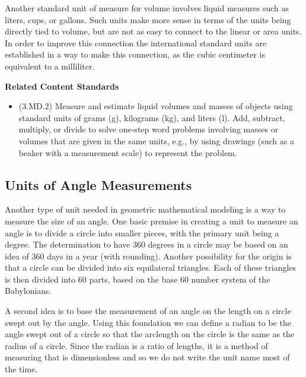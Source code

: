 \documentclass[
]{book}
\providecommand{\tightlist}{%
  \setlength{\itemsep}{0pt}\setlength{\parskip}{0pt}}
\newenvironment{standards}{}{}
\theoremstyle{definition}
\theoremstyle{definition}
\theoremstyle{definition}
\theoremstyle{definition}
\theoremstyle{remark}
\begin{document}
Another standard unit of measure for volume involves liquid measures such as liters, cups, or gallons. Such units make more sense in terms of the units being directly tied to volume, but are not as easy to connect to the linear or area units. In order to improve this connection the international standard units are established in a way to make this connection, as the cubic centimeter is equivalent to a milliliter.

\begin{standards}

\begin{center}
\textbf{Related Content Standards}

\end{center}

\begin{itemize}
\tightlist
\item
  (3.MD.2) Measure and estimate liquid volumes and masses of objects using standard units of grams (g), kilograms (kg), and liters (l). Add, subtract, multiply, or divide to solve one-step word problems involving masses or volumes that are given in the same units, e.g., by using drawings (such as a beaker with a measurement scale) to represent the problem.
\end{itemize}

\end{standards}

\hypertarget{units-of-angle-measurements}{%
\subsection{Units of Angle Measurements}\label{units-of-angle-measurements}}

Another type of unit needed in geometric mathematical modeling is a way to measure the size of an angle. One basic premise in creating a unit to measure an angle is to divide a circle into smaller pieces, with the primary unit being a degree. The determination to have 360 degrees in a circle may be based on an idea of 360 days in a year (with rounding). Another possibility for the origin is that a circle can be divided into six equilateral triangles. Each of these triangles is then divided into 60 parts, based on the base 60 number system of the Babylonians.

A second idea is to base the measurement of an angle on the length on a circle swept out by the angle. Using this foundation we can define a radian to be the angle swept out of a circle so that the arclength on the circle is the same as the radius of a circle. Since the radian is a ratio of lengths, it is a method of measuring that is dimensionless and so we do not write the unit name most of the time.
\end{document}
